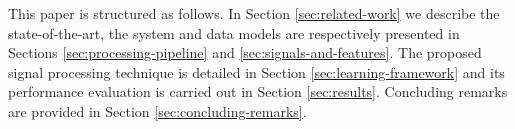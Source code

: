 This paper is structured as follows. In Section \ref{sec:related-work}
we describe the state-of-the-art, the system and data models are
respectively presented in Sections \ref{sec:processing-pipeline} and
\ref{sec:signals-and-features}. The proposed signal processing
technique is detailed in Section \ref{sec:learning-framework} and its
performance evaluation is carried out in Section
\ref{sec:results}. Concluding remarks are provided in Section
\ref{sec:concluding-remarks}.

